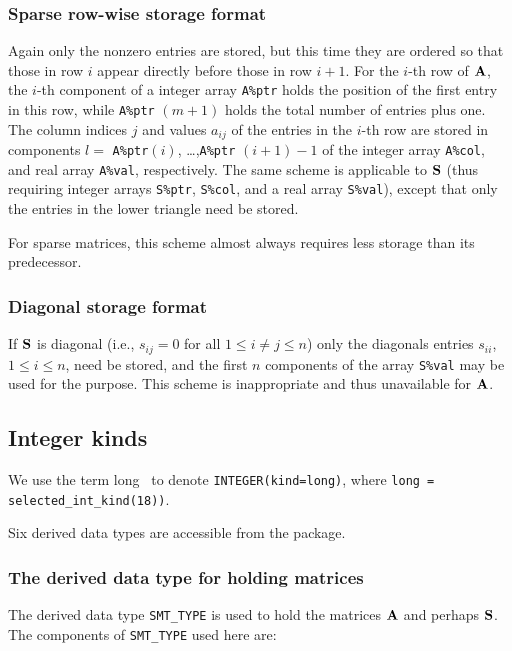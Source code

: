\documentclass{galahad}
\begin{document}
\subsubsection{Sparse row-wise storage format}\label{rowwise}
Again only the nonzero entries are stored, but this time
they are ordered so that those in row $i$ appear directly before those
in row $i+1$. For the $i$-th row of ${\mathbf{A}}$, the $i$-th component of a
integer array {\tt A\%ptr} holds the position of the first entry in this row,
while {\tt A\%ptr} $(m+1)$ holds the total number of entries plus one.
The column indices $j$ and values $a_{ij}$ of the entries in the $i$-th row
are stored in components
$l =$ {\tt A\%ptr}$(i)$, \ldots ,{\tt A\%ptr} $(i+1)-1$ of the
integer array {\tt A\%col}, and real array {\tt A\%val}, respectively.
The same scheme is applicable to
${\mathbf{S}}$ (thus requiring integer arrays {\tt S\%ptr}, {\tt S\%col}, and
a real array {\tt S\%val}),
except that only the entries in the lower triangle need be stored.

For sparse matrices, this scheme almost always requires less storage than
its predecessor.

\subsubsection{Diagonal storage format}\label{diagonal}
If ${\mathbf{S}}$ is diagonal (i.e., $s_{ij} = 0$ for all $1 \leq i \neq j \leq n$)
only the diagonals entries $s_{ii}$, $1 \leq i \leq n$,  need be stored,
and the first $n$ components of the array {\tt S\%val} may be used for
the purpose. This scheme is inappropriate and thus unavailable for ${\mathbf{A}}$.

\subsection{Integer kinds}\label{Integer kinds}
We use the term
long \integer\ to denote {\tt INTEGER\-(kind=long)}, where
{\tt long = selected\_int\_kind(18))}.





\galtypes
Six derived data types are accessible from the package.


\subsubsection{The derived data type for holding matrices}\label{typesmt}
The derived data type {\tt SMT\_TYPE} is used to hold the matrices ${\mathbf{A}}$
and perhaps ${\mathbf{S}}$.
The components of {\tt SMT\_TYPE} used here are:
\end{document}
